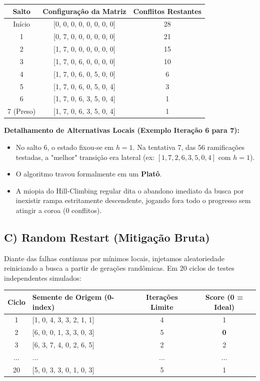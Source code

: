\begin{table}[H]
\centering
\begin{tabular}{|c|c|c|}
\hline
\textbf{Salto} & \textbf{Configuração da Matriz} & \textbf{Conflitos Restantes} \\ \hline
Início & [0, 0, 0, 0, 0, 0, 0, 0] & 28 \\ \hline
1 & [0, 7, 0, 0, 0, 0, 0, 0] & 21 \\ \hline
2 & [1, 7, 0, 0, 0, 0, 0, 0] & 15 \\ \hline
3 & [1, 7, 0, 6, 0, 0, 0, 0] & 10 \\ \hline
4 & [1, 7, 0, 6, 0, 5, 0, 0] & 6 \\ \hline
5 & [1, 7, 0, 6, 0, 5, 0, 4] & 3 \\ \hline
6 & [1, 7, 0, 6, 3, 5, 0, 4] & 1 \\ \hline
7 (Preso) & [1, 7, 0, 6, 3, 5, 0, 4] & 1 \\ \hline
\end{tabular}
\end{table}

\textbf{Detalhamento de Alternativas Locais (Exemplo Iteração 6 para 7):}
\begin{itemize}
    \item No salto 6, o estado fixou-se em $h=1$. Na tentativa 7, das 56 ramificações testadas, a "melhor" transição era lateral (ex: $[1, 7, 2, 6, 3, 5, 0, 4]$ com $h=1$).
    \item O algoritmo travou formalmente em um \textbf{Platô}.
    \item A miopia do Hill-Climbing regular dita o abandono imediato da busca por inexistir rampa estritamente descendente, jogando fora todo o progresso sem atingir a coroa (0 conflitos).
\end{itemize}

\subsection*{C) Random Restart (Mitigação Bruta)}

Diante das falhas contínuas por mínimos locais, injetamos aleatoriedade reiniciando a busca a partir de gerações randômicas. Em 20 ciclos de testes independentes simulados:

\begin{table}[H]
\centering
\begin{tabular}{|c|l|c|c|}
\hline
\textbf{Ciclo} & \textbf{Semente de Origem (0-index)} & \textbf{Iterações Limite} & \textbf{Score (0 = Ideal)} \\ \hline
1 & [1, 0, 4, 3, 3, 2, 1, 1] & 4 & 1 \\ \hline
2 & [6, 0, 0, 1, 3, 3, 0, 3] & 5 & \textbf{0} \\ \hline
3 & [6, 3, 7, 4, 0, 2, 6, 5] & 2 & 2 \\ \hline
... & ... & ... & ... \\ \hline
20 & [5, 0, 3, 3, 0, 1, 0, 3] & 5 & 1 \\ \hline
\end{tabular}
\end{table}

